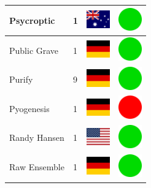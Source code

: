 \documentclass[12pt, a4paper, twoside]{report}
\begin{document}
\begin{center}
\begin{longtable}{|p{5cm}|p{2cm}|p{2cm}|p{2cm}|}
			Psycroptic & 1 & \includegraphics[width=1cm]{4x3/au} & \includegraphics[width=1cm]{likes/y} \\ \hline
			Public Grave & 1 & \includegraphics[width=1cm]{4x3/de} & \includegraphics[width=1cm]{likes/y} \\ \hline
			Purify & 9 & \includegraphics[width=1cm]{4x3/de} & \includegraphics[width=1cm]{likes/y} \\ \hline
			Pyogenesis & 1 & \includegraphics[width=1cm]{4x3/de} & \includegraphics[width=1cm]{likes/n} \\ \hline
			Randy Hansen & 1 & \includegraphics[width=1cm]{4x3/us} & \includegraphics[width=1cm]{likes/y} \\ \hline
			Raw Ensemble & 1 & \includegraphics[width=1cm]{4x3/de} & \includegraphics[width=1cm]{likes/y} \\ \hline

\end{longtable}
\end{center}
\end{document}
